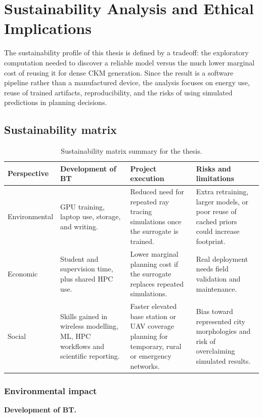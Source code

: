 \chapter{Sustainability Analysis and Ethical Implications}

The sustainability profile of this thesis is defined by a tradeoff: the
exploratory computation needed to discover a reliable model versus the much
lower marginal cost of reusing it for dense CKM generation. Since the result is
a software pipeline rather than a manufactured device, the analysis focuses on
energy use, reuse of trained artifacts, reproducibility, and the risks of using
simulated predictions in planning decisions.

\section{Sustainability matrix}

\begin{table}[htbp]
\centering
\caption{Sustainability matrix summary for the thesis.}
\label{tab:sustainability_matrix}
\scriptsize
\begin{tabularx}{\textwidth}{lXXX}
\toprule
Perspective & Development of BT & Project execution & Risks and limitations \\
\midrule
Environmental &
GPU training, laptop use, storage, and writing. &
Reduced need for repeated ray tracing simulations once the surrogate is trained. &
Extra retraining, larger models, or poor reuse of cached priors could increase footprint. \\
Economic &
Student and supervision time, plus shared HPC use. &
Lower marginal planning cost if the surrogate replaces repeated simulations. &
Real deployment needs field validation and maintenance. \\
Social &
Skills gained in wireless modelling, ML, HPC workflows and scientific reporting. &
Faster elevated base station or UAV coverage planning for temporary, rural or
emergency networks. &
Bias toward represented city morphologies and risk of overclaiming simulated results. \\
\bottomrule
\end{tabularx}
\end{table}

\subsection{Environmental impact}

\textbf{Development of BT.}

